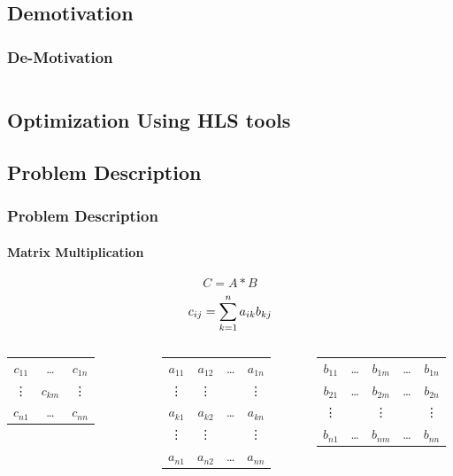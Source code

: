 \documentclass{beamer}
\begin{document}
\begin{frame}
\subsection{Demotivation}
\frametitle{De-Motivation}
\begin{columns}[c]

\scalebox{0.7}{

}
\scalebox{0.3}{

}


\end{columns}
\end{frame}
\begin{frame}
\section{Optimization Using HLS tools}
\subsection{Problem Description}
\frametitle{Problem Description}
\framesubtitle{Matrix Multiplication}


$$ C = A * B $$
$$c_{ij}=\sum_{k=1}^{n}a_{ik} \* b_{kj} $$

\begin{columns}[c]



\begin{tabular}{|c c c|}
$c_{11}$&\dots&$c_{1n}$\\
\vdots&\alert{$c_{km}$}&\vdots\\
$c_{n1}$&\dots&$c_{nn}$\\
\end{tabular}

\begin{tabular}{|c c c c|}
$a_{11}$&$a_{12}$&\dots&$a_{1n}$\\
\vdots&\vdots&&\vdots\\
\alert{$a_{k1}$}&\alert{$a_{k2}$}&\dots&\alert{$a_{kn}$}\\
\vdots&\vdots&&\vdots\\
$a_{n1}$&$a_{n2}$&\dots&$a_{nn}$\\
\end{tabular}

\begin{tabular}{|c c c c c|}
$b_{11}$&\dots&\alert{$b_{1m}$}&\dots&$b_{1n}$\\
$b_{21}$&\dots&\alert{$b_{2m}$}&\dots&$b_{2n}$\\
\vdots&&\vdots&&\vdots\\
$b_{n1}$&\dots&\alert{$b_{nm}$}&\dots&$b_{nn}$\\
\end{tabular}



\end{columns}


\end{frame}
\end{document}
